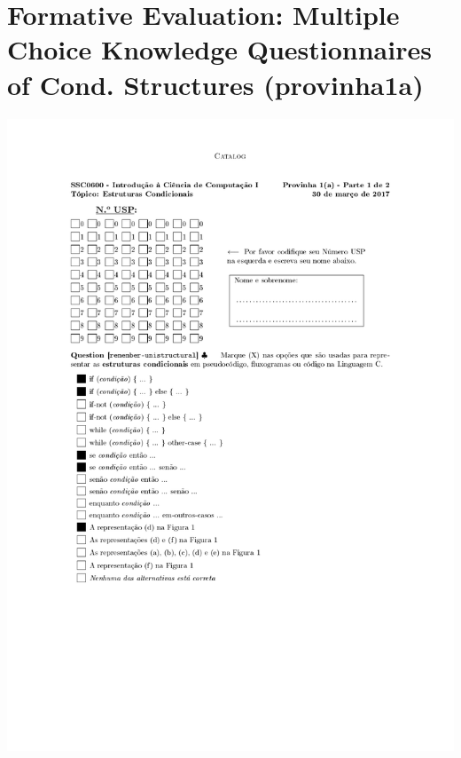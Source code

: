 \section{Formative Evaluation: Multiple Choice Knowledge Questionnaires of Cond. Structures (provinha1a)}
\label{annex:first-study-pre}
\includegraphics[page=1,width=1\textwidth]{images/annex/first-study-pre-1.pdf}
\newpage
